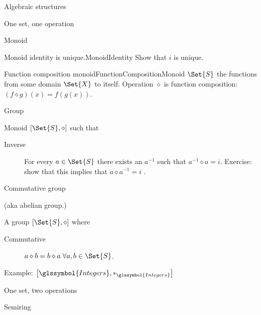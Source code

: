 \begin{plSection}{Algebraic structures}
\begin{plSection}{One set, one operation}
\begin{plSection}{Monoid}
\begin{plExercise}{Monoid identity is unique.}{MonoidIdentity}
Show that $i$ is unique.
\end{plExercise}%

\begin{plExample}{Function composition monoid}{FunctionCompositionMonoid}
$\Set{S}$ the functions from some domain $\Set{X}$ to itself. 
Operation $\diamond$ is function composition:
$\left( f \diamond g \right) (x) = 
f \left( g \left( x \right) \right)$.
\end{plExample}%

\end{plSection}%

\begin{plSection}{Group}

Monoid $\left[ \Set{S}, \diamond \right]$ such that
\begin{description}
 \item[Inverse] For every $a \in \Set{S}$ there exists an
 $a^{-1}$ such that $a^{-1} \diamond a = i$.
 Exercise: show that this implies that $a \diamond a^{-1} = i$ .
\end{description}

\end{plSection}
\begin{plSection}{Commutative group}

(aka abelian group.)

A group $\left[ \Set{S}, \diamond \right]$ where
\begin{description}
 \item[Commutative] $a \diamond b = b \diamond a \; \forall a,b \in \Set{S}$.
\end{description}

Example: 
$\left[ \glssymbol{Integers}, *_{\glssymbol{Integers}} \right]$

\end{plSection}
\end{plSection}
\begin{plSection}{One set, two operations}
\begin{plSection}{Semiring}
\label{sec:Semiring}


\end{plSection}
\end{plSection}
\end{plSection}

